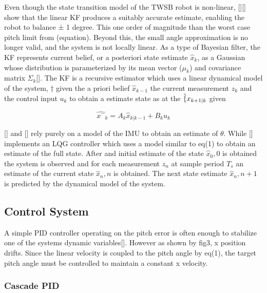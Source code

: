         Even though the state transition model of the TWSB robot is non-linear, 
        [][] show that the linear KF produces a suitably accurate estimate, enabling the robot to balance ± 1 degree.
        This one order of magnitude than the worst case pitch limit from (equation). Beyond this, the small angle approximation is no longer valid, 
        and the system is not locally linear. 
        As a type of Bayesian filter, the KF represents current belief, or a posteriori state estimate $\hat{x}_k$,
        as a Gaussian whose distribution is parameterized by its mean vector ($\mu_k$) and covariance matrix $\Sigma_k$[]. 
        The KF is a recursive estimator which uses a linear dynamical model of the system, †
        given the a priori belief $\hat x_{k-1}$ the current measurement $z_k$ and the control input $u_k$ 
        to obtain a estimate state as at the $\hat\{x_{{k+1}| k}$ given


        \begin{equation}
            \hat{x^-}_{k} = A_k \hat{x}_{k|k-1} + B_k u_k
        \end{equation}
        
        [] and [] rely purely on a model of the IMU 
        to obtain an estimate of $\theta$. 
        While [] implements an LQG controller which uses a model similar to eq(1) to obtain an estimate of the full state.
        After and initial estimate of the state $\hat x_0,0$ is obtained the system is observed and 
        for each measurement $z_n$ at sample period $T_s$ an estimate of the current state $\hat x_n,n$ is obtained.
        The next state estimate $\hat x_n,n+1$ is predicted by the dynamical model of the system.



        \pagebreak{}
    \subsection{Control System}

        A simple PID controller operating on the pitch error is often enough to stabilize one 
        of the systems dynamic variables[].
        However as shown by fig3, x position drifts. Since the linear velocity is coupled to the
        pitch angle by eq(1), the target pitch angle must be controlled to maintain a constant x velocity. 
        

        \subsubsection{Cascade PID}

